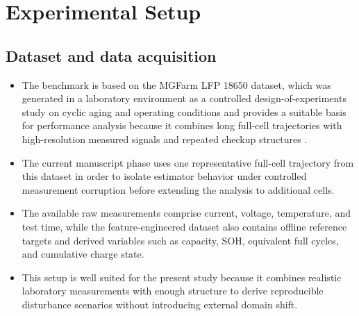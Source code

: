 \documentclass[review,nopreprintline]{elsarticle}
\begin{document}
\section{Experimental Setup}
\subsection{Dataset and data acquisition}
\begin{itemize}[leftmargin=*]
    \item The benchmark is based on the MGFarm LFP 18650 dataset, which was generated in a laboratory environment as a controlled design-of-experiments study on cyclic aging and operating conditions and provides a suitable basis for performance analysis because it combines long full-cell trajectories with high-resolution measured signals and repeated checkup structures \cite{aqachtoulMGFARMIoTEdgeDriven2026,LFP_DoE_Cycle_Aging_Dataset,siebertzStatistischeVersuchsplanung2017}.
    \item The current manuscript phase uses one representative full-cell trajectory from this dataset in order to isolate estimator behavior under controlled measurement corruption before extending the analysis to additional cells.
    \item The available raw measurements comprise current, voltage, temperature, and test time, while the feature-engineered dataset also contains offline reference targets and derived variables such as capacity, SOH, equivalent full cycles, and cumulative charge state.
    \item This setup is well suited for the present study because it combines realistic laboratory measurements with enough structure to derive reproducible disturbance scenarios without introducing external domain shift.
\end{itemize}
\end{document}
